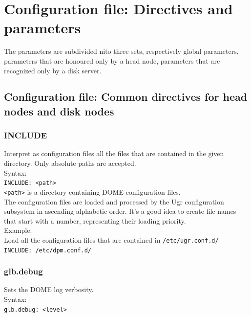 \documentclass[a4paper,10pt]{scrreprt}
\begin{document}
\section{Configuration file: Directives and parameters}
The parameters are subdivided nito three sets, respectively global parameters, parameters that are honoured only by a head node, parameters that are recognized only by a disk server.



\subsection{Configuration file: Common directives for head nodes and disk nodes}

\subsubsection{INCLUDE}
Interpret as configuration files all the files that are contained in the given directory.
Only absolute paths are accepted.\\

Syntax:\\

\lstinline"INCLUDE: <path>"\\

\lstinline"<path>" is a directory containing DOME configuration files.\\

The configuration files are loaded and processed by the Ugr configuration subsystem
in ascending alphabetic order. It's a good idea to create file names that start with a number,
representing their loading priority.\\

Example:\\
Load all the configuration files that are contained in \lstinline"/etc/ugr.conf.d/"\\
\lstinline"INCLUDE: /etc/dpm.conf.d/"

\subsubsection{glb.debug}

 Sets the DOME log verbosity.\\

 Syntax:\\

\lstinline"glb.debug: <level>"\\
\end{document}
